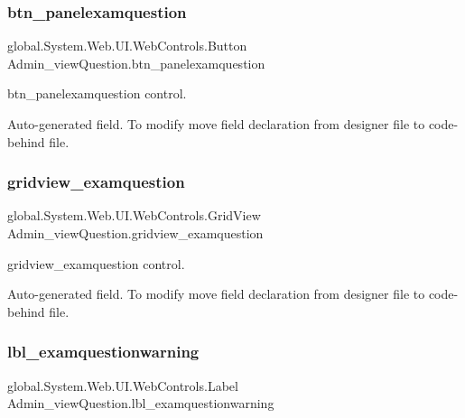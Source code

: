 \subsubsection{\texorpdfstring{btn\_panelexamquestion}{btn\_panelexamquestion}}
{\footnotesize\ttfamily global.\+System.\+Web.\+U\+I.\+Web\+Controls.\+Button Admin\+\_\+view\+Question.\+btn\+\_\+panelexamquestion\hspace{0.3cm}{\ttfamily [protected]}}



btn\+\_\+panelexamquestion control. 

Auto-\/generated field. To modify move field declaration from designer file to code-\/behind file. \mbox{\label{class_admin__view_question_ae215f4872b017d9be1bd94daa550872a}} 
\subsubsection{\texorpdfstring{gridview\_examquestion}{gridview\_examquestion}}
{\footnotesize\ttfamily global.\+System.\+Web.\+U\+I.\+Web\+Controls.\+Grid\+View Admin\+\_\+view\+Question.\+gridview\+\_\+examquestion\hspace{0.3cm}{\ttfamily [protected]}}



gridview\+\_\+examquestion control. 

Auto-\/generated field. To modify move field declaration from designer file to code-\/behind file. \mbox{\label{class_admin__view_question_a2f6b68dbe16ebda8ae5091b02bd0a2ab}} 
\subsubsection{\texorpdfstring{lbl\_examquestionwarning}{lbl\_examquestionwarning}}
{\footnotesize\ttfamily global.\+System.\+Web.\+U\+I.\+Web\+Controls.\+Label Admin\+\_\+view\+Question.\+lbl\+\_\+examquestionwarning\hspace{0.3cm}{\ttfamily [protected]}}



